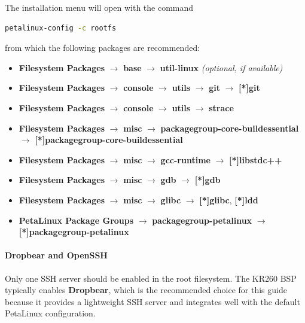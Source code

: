 The installation menu will open with the command
\vspace{0.1cm}
\begin{lstlisting}[language=bash]
	petalinux-config -c rootfs	
\end{lstlisting}
\vspace{0.1cm}
from which the following packages are recommended:
\begin{itemize}
	
	\item \textbf{Filesystem Packages} $\rightarrow$ \textbf{base} $\rightarrow$ \textbf{util-linux} \textit{(optional, if available)}
	
	\item \textbf{Filesystem Packages} $\rightarrow$ \textbf{console} $\rightarrow$ \textbf{utils} $\rightarrow$ \textbf{git} $\rightarrow$ \textbf{[*]git}
	
	\item \textbf{Filesystem Packages} $\rightarrow$ \textbf{console} $\rightarrow$ \textbf{utils} $\rightarrow$ \textbf{strace}
	
	\item \textbf{Filesystem Packages} $\rightarrow$ \textbf{misc} $\rightarrow$ \textbf{packagegroup-core-buildessential} $\rightarrow$ \textbf{[*]packagegroup-core-buildessential}
	
	\item \textbf{Filesystem Packages} $\rightarrow$ \textbf{misc} $\rightarrow$ \textbf{gcc-runtime} $\rightarrow$ \textbf{[*]libstdc++}
	
	\item \textbf{Filesystem Packages} $\rightarrow$ \textbf{misc} $\rightarrow$ \textbf{gdb} $\rightarrow$ \textbf{[*]gdb}
	
	\item \textbf{Filesystem Packages} $\rightarrow$ \textbf{misc} $\rightarrow$ \textbf{glibc} $\rightarrow$ \textbf{[*]glibc}, \textbf{[*]ldd}
	
	\item \textbf{PetaLinux Package Groups} $\rightarrow$ \textbf{packagegroup-petalinux} $\rightarrow$ \textbf{[*]packagegroup-petalinux}
\end{itemize}


\paragraph{Dropbear and OpenSSH}
Only one SSH server should be enabled in the root filesystem. The KR260 BSP
typically enables \textbf{Dropbear}, which is the recommended choice for this
guide because it provides a lightweight SSH server and integrates well with the
default PetaLinux configuration.

